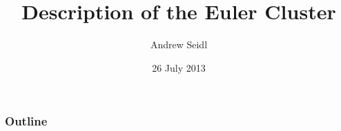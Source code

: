 \documentclass[t]{beamer}
\title{Description of the Euler Cluster}
\author{Andrew Seidl}
\institute{Wisconsin Applied Computing Center}
\date{26 July 2013}
\begin{document}
\begin{frame}
\titlepage
\end{frame}

\begin{frame}
\frametitle{Outline}
\tableofcontents
\end{frame}


\end{document}
